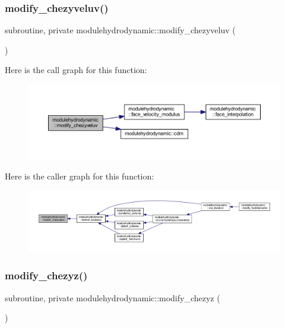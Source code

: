 \subsubsection{\texorpdfstring{modify\+\_\+chezyveluv()}{modify\_chezyveluv()}}
{\footnotesize\ttfamily subroutine, private modulehydrodynamic\+::modify\+\_\+chezyveluv (\begin{DoxyParamCaption}{ }\end{DoxyParamCaption})\hspace{0.3cm}{\ttfamily [private]}}

Here is the call graph for this function\+:\nopagebreak
\begin{figure}[H]
\begin{center}
\leavevmode
\includegraphics[width=350pt]{namespacemodulehydrodynamic_a8e14732a1f66519f456c093908a3ee4b_cgraph}
\end{center}
\end{figure}
Here is the caller graph for this function\+:\nopagebreak
\begin{figure}[H]
\begin{center}
\leavevmode
\includegraphics[width=350pt]{namespacemodulehydrodynamic_a8e14732a1f66519f456c093908a3ee4b_icgraph}
\end{center}
\end{figure}
\mbox{\label{namespacemodulehydrodynamic_a4b8bde093197fe02063699036c456839}} 
\subsubsection{\texorpdfstring{modify\+\_\+chezyz()}{modify\_chezyz()}}
{\footnotesize\ttfamily subroutine, private modulehydrodynamic\+::modify\+\_\+chezyz (\begin{DoxyParamCaption}{ }\end{DoxyParamCaption})\hspace{0.3cm}{\ttfamily [private]}}


